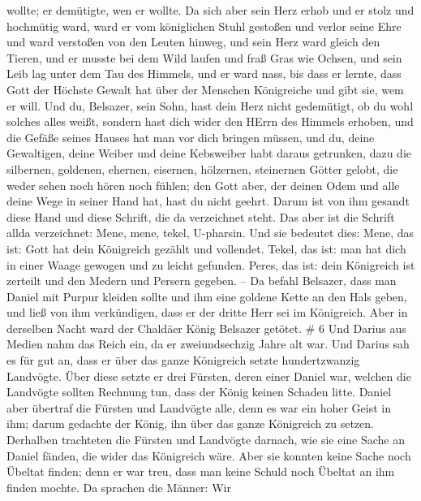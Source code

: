 wollte; er demütigte, wen er wollte.  Da sich aber sein
Herz erhob und er stolz und hochmütig ward, ward er vom königlichen
Stuhl gestoßen und verlor seine Ehre  und ward verstoßen
von den Leuten hinweg, und sein Herz ward gleich den Tieren, und er
musste bei dem Wild laufen und fraß Gras wie Ochsen, und sein Leib lag
unter dem Tau des Himmels, und er ward nass, bis dass er lernte, dass
Gott der Höchste Gewalt hat über der Menschen Königreiche und gibt sie,
wem er will.  Und du, Belsazer, sein Sohn, hast dein Herz
nicht gedemütigt, ob du wohl solches alles weißt,  sondern
hast dich wider den HErrn des Himmels erhoben, und die Gefäße seines
Hauses hat man vor dich bringen müssen, und du, deine Gewaltigen, deine
Weiber und deine Kebsweiber habt daraus getrunken, dazu die silbernen,
goldenen, ehernen, eisernen, hölzernen, steinernen Götter gelobt, die
weder sehen noch hören noch fühlen; den Gott aber, der deinen Odem und
alle deine Wege in seiner Hand hat, hast du nicht geehrt. 
Darum ist von ihm gesandt diese Hand und diese Schrift, die da
verzeichnet steht.  Das aber ist die Schrift allda
verzeichnet: Mene, mene, tekel, U-pharsin.  Und sie
bedeutet dies: Mene, das ist: Gott hat dein Königreich gezählt und
vollendet.  Tekel, das ist: man hat dich in einer Waage
gewogen und zu leicht gefunden.  Peres, das ist: dein
Königreich ist zerteilt und den Medern und Persern gegeben. --
 Da befahl Belsazer, dass man Daniel mit Purpur kleiden
sollte und ihm eine goldene Kette an den Hals geben, und ließ von ihm
verkündigen, dass er der dritte Herr sei im Königreich. 
Aber in derselben Nacht ward der Chaldäer König Belsazer getötet. \# 6
 Und Darius aus Medien nahm das Reich ein, da er
zweiundsechzig Jahre alt war.  Und Darius sah es für gut an,
dass er über das ganze Königreich setzte hundertzwanzig Landvögte.
 Über diese setzte er drei Fürsten, deren einer Daniel war,
welchen die Landvögte sollten Rechnung tun, dass der König keinen
Schaden litte.  Daniel aber übertraf die Fürsten und
Landvögte alle, denn es war ein hoher Geist in ihm; darum gedachte der
König, ihn über das ganze Königreich zu setzen.  Derhalben
trachteten die Fürsten und Landvögte darnach, wie sie eine Sache an
Daniel fänden, die wider das Königreich wäre. Aber sie konnten keine
Sache noch Übeltat finden; denn er war treu, dass man keine Schuld noch
Übeltat an ihm finden mochte.  Da sprachen die Männer: Wir

